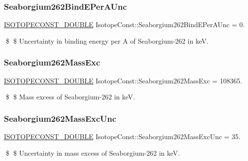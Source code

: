 \subsubsection{\texorpdfstring{Seaborgium262\+Bind\+E\+Per\+A\+Unc}{Seaborgium262BindEPerAUnc}}
{\footnotesize\ttfamily \mbox{\hyperlink{group___isotope_const-_macros_ga8f45a7272ce02c0b4c65c44636ed719a}{I\+S\+O\+T\+O\+P\+E\+C\+O\+N\+S\+T\+\_\+\+D\+O\+U\+B\+LE}} Isotope\+Const\+::\+Seaborgium262\+Bind\+E\+Per\+A\+Unc = 0.}

\$ \$ Uncertainty in binding energy per A of Seaborgium-\/262 in keV. \mbox{\label{group___isotope_const-_seaborgium-_sg262_gacf8d6505421f96358959dbe4d8e152d7}} 
\subsubsection{\texorpdfstring{Seaborgium262\+Mass\+Exc}{Seaborgium262MassExc}}
{\footnotesize\ttfamily \mbox{\hyperlink{group___isotope_const-_macros_ga8f45a7272ce02c0b4c65c44636ed719a}{I\+S\+O\+T\+O\+P\+E\+C\+O\+N\+S\+T\+\_\+\+D\+O\+U\+B\+LE}} Isotope\+Const\+::\+Seaborgium262\+Mass\+Exc = 108365.}

\$ \$ Mass excess of Seaborgium-\/262 in keV. \mbox{\label{group___isotope_const-_seaborgium-_sg262_ga2c44b7972e111487461f56392665bece}} 
\subsubsection{\texorpdfstring{Seaborgium262\+Mass\+Exc\+Unc}{Seaborgium262MassExcUnc}}
{\footnotesize\ttfamily \mbox{\hyperlink{group___isotope_const-_macros_ga8f45a7272ce02c0b4c65c44636ed719a}{I\+S\+O\+T\+O\+P\+E\+C\+O\+N\+S\+T\+\_\+\+D\+O\+U\+B\+LE}} Isotope\+Const\+::\+Seaborgium262\+Mass\+Exc\+Unc = 35.}

\$ \$ Uncertainty in mass excess of Seaborgium-\/262 in keV. \mbox{\label{group___isotope_const-_seaborgium-_sg262_gad24f7c671af17a77bb6c91e23f6f8069}} 
